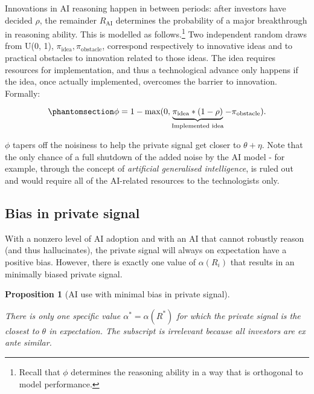 \documentclass[
]{article}
\theoremstyle{plain}
\newtheorem{proposition}{Proposition}[section]
\theoremstyle{definition}
\theoremstyle{remark}
\begin{document}
Innovations in AI reasoning happen in between periods: after investors
have decided \(\rho\), the remainder \(R_{\text{AI}}\) determines the
probability of a major breakthrough in reasoning ability. This is
modelled as follows.\footnote{Recall that \(\phi\) determines the
  reasoning ability in a way that is orthogonal to model performance.}
Two independent random draws from U(0, 1),
\(\pi_{\text{idea}}, \pi_{\text{obstacle}}\), correspond respectively to
innovative ideas and to practical obstacles to innovation related to
those ideas. The idea requires resources for implementation, and thus a
technological advance only happens if the idea, once actually
implemented, overcomes the barrier to innovation. Formally:

\begin{equation}\phantomsection\label{eq-tech}{
\phi = 1-\text{max}(0, \underbrace{\pi_{\text{idea}} * (1-\rho)}_{\text{Implemented idea}} - \pi_{\text{obstacle}}).
}\end{equation}

\(\phi\) tapers off the noisiness to help the private signal get closer
to \(\theta + \eta\). Note that the only chance of a full shutdown of
the added noise by the AI model - for example, through the concept of
\emph{artificial generalised intelligence}, is ruled out and would
require all of the AI-related resources to the technologists only.

\subsection{Bias in private signal}\label{bias-in-private-signal}

With a nonzero level of AI adoption and with an AI that cannot robustly
reason (and thus hallucinates), the private signal will always on
expectation have a positive bias. However, there is exactly one value of
\(\alpha(R_i)\) that results in an minimally biased private signal.

\begin{proposition}[AI use with minimal bias in private
signal]\protect\hypertarget{prp-alphainvestlowestbias}{}\label{prp-alphainvestlowestbias}

There is only one specific value \(\alpha^* = \alpha(R^*)\) for which
the private signal is the closest to \(\theta\) in expectation. The
subscript is irrelevant because all investors are ex ante similar.

\end{proposition}
\end{document}
